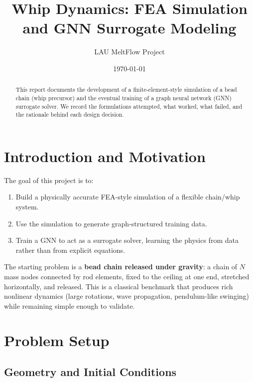 \documentclass[11pt,a4paper]{article}
\title{Whip Dynamics: FEA Simulation and GNN Surrogate Modeling}
\author{LAU MeltFlow Project}
\date{\today}
\begin{document}
\maketitle

\begin{abstract}
This report documents the development of a finite-element-style simulation
of a bead chain (whip precursor) and the eventual training of a graph neural
network (GNN) surrogate solver. We record the formulations attempted, what
worked, what failed, and the rationale behind each design decision.
\end{abstract}

\tableofcontents
\newpage

\section{Introduction and Motivation}

The goal of this project is to:
\begin{enumerate}
    \item Build a physically accurate FEA-style simulation of a flexible
          chain/whip system.
    \item Use the simulation to generate graph-structured training data.
    \item Train a GNN to act as a surrogate solver, learning the
          physics from data rather than from explicit equations.
\end{enumerate}

The starting problem is a \textbf{bead chain released under gravity}: a
chain of $N$ mass nodes connected by rod elements, fixed to the ceiling at
one end, stretched horizontally, and released. This is a classical benchmark
that produces rich nonlinear dynamics (large rotations, wave propagation,
pendulum-like swinging) while remaining simple enough to validate.

\section{Problem Setup}

\subsection{Geometry and Initial Conditions}
\end{document}
